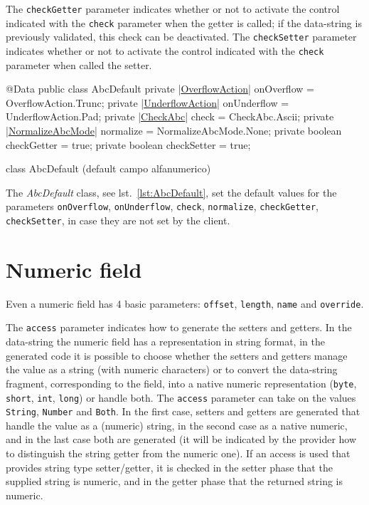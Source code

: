 \documentclass[a4paper,10pt]{report}
\newenvironment{elisting}[1][H]
  {\captionsetup{aboveskip=0pt}\begin{listing}[#1]}
  {\end{listing}%
}
\begin{document}
The \hypertarget{abc:get}{\texttt{checkGetter}} parameter indicates whether or 
not to activate the control indicated with the \verb!check! parameter when the 
getter is called; if the data-string is previously validated, this check can be 
deactivated. 
The \hypertarget{abc:set}{\texttt{checkSetter}} parameter indicates whether or 
not to activate the control indicated with the \verb!check! parameter when 
called the setter.

\begin{elisting}[!htb]
\begin{javacode}
@Data
public class AbcDefault {
    private |\hyperref[lst:OverflowAction]{OverflowAction}| onOverflow = OverflowAction.Trunc;
    private |\hyperref[lst:UnderflowAction]{UnderflowAction}| onUnderflow = UnderflowAction.Pad;
    private |\hyperref[lst:CheckAbc]{CheckAbc}| check = CheckAbc.Ascii;
    private |\hyperref[lst:NormalizeAbcMode]{NormalizeAbcMode}| normalize = NormalizeAbcMode.None;
    private boolean checkGetter = true;
    private boolean checkSetter = true;
}
\end{javacode}
\caption{class AbcDefault (default campo alfanumerico)}
\label{lst:AbcDefault}
\end{elisting}

The \textsl{AbcDefault} class, see lst.~\ref{lst:AbcDefault}, set the default 
values for the parameters \verb!onOverflow!, \verb!onUnderflow!, \verb!check!, 
\verb!normalize!, \verb!checkGetter!, \verb!checkSetter!, in case they are not 
set by the client.

\section{Numeric field}\label{sec:spi.num}
Even a numeric field has 4 basic parameters: \verb!offset!, \verb!length!,
\verb!name! and \verb!override!.

The \verb!access! parameter indicates how to generate the setters and getters. 
In the data-string the numeric field has a representation in string format, in 
the generated code it is possible to choose whether the setters and getters 
manage the value as a string (with numeric characters) or to convert 
the data-string fragment, corresponding to the field, into a native numeric 
representation (\verb!byte!, \verb!short!, \verb!int!, \verb!long!) or 
handle both.
%
The \verb!access! parameter can take on the values \verb!String!, \verb!Number! 
and \verb!Both!. In the first case, setters and getters are generated that 
handle the value as a (numeric) string, in the second case as a native numeric, 
and in the last case both are generated (it will be indicated by the provider 
how to distinguish the string getter from the numeric one). 
If an access is used that provides string type setter/getter, it is checked in 
the setter phase that the supplied string is numeric, and in the getter phase 
that the returned string is numeric.
\end{document}
